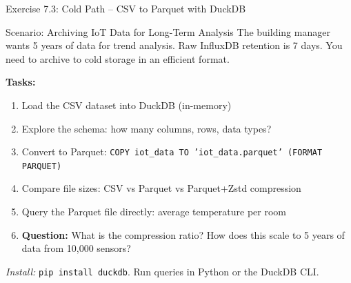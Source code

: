 \documentclass[aspectratio=169,11pt]{beamer}
\begin{document}
\begin{frame}{Exercise 7.3: Cold Path -- CSV to Parquet with DuckDB}
    \begin{block}{Scenario: Archiving IoT Data for Long-Term Analysis}
        The building manager wants 5 years of data for trend analysis. Raw InfluxDB retention is 7 days. You need to archive to cold storage in an efficient format.
    \end{block}

    \vspace{0.2cm}
    \textbf{Tasks:}
    \begin{enumerate}
        \item Load the CSV dataset into DuckDB (in-memory)
        \item Explore the schema: how many columns, rows, data types?
        \item Convert to Parquet: \texttt{\scriptsize COPY iot\_data TO 'iot\_data.parquet' (FORMAT PARQUET)}
        \item Compare file sizes: CSV vs Parquet vs Parquet+Zstd compression
        \item Query the Parquet file directly: average temperature per room
        \item \textbf{Question:} What is the compression ratio? How does this scale to 5 years of data from 10,000 sensors?
    \end{enumerate}

    \vspace{0.1cm}
    {\footnotesize \textit{Install:} \texttt{pip install duckdb}. Run queries in Python or the DuckDB CLI.}
\end{frame}
\end{document}
